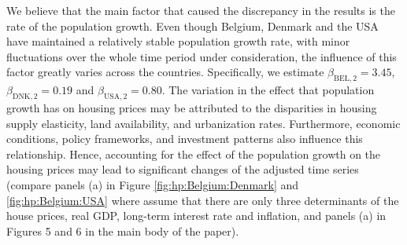 \documentclass[a4paper,12pt]{article}
\begin{document}
\begin{enumerate}[label=\arabic*.,leftmargin=0.6cm]
We believe that the main factor that caused the discrepancy in the results is the rate of the population growth. Even though Belgium, Denmark and the USA have maintained a relatively stable population growth rate, with minor fluctuations over the whole time period under consideration, the influence of this factor greatly varies across the countries. Specifically, we estimate $\beta_{\text{BEL}, 2} = 3.45$, $\beta_{\text{DNK}, 2} = 0.19$ and $\beta_{\text{USA}, 2} = 0.80$. The variation in the effect that population growth has on housing prices may be attributed to the disparities in housing supply elasticity, land availability, and urbanization rates. Furthermore, economic conditions, policy frameworks, and investment patterns also influence this relationship. Hence, accounting for the effect of the population growth on the housing prices may lead to significant changes of the adjusted time series (compare panels (a) in Figure \ref{fig:hp:Belgium:Denmark} and \ref{fig:hp:Belgium:USA} where assume that there are only three determinants of the house prices, real GDP, long-term interest rate and inflation, and panels (a) in Figures 5 and 6 in the main body of the paper).


\end{enumerate}
\end{document}
